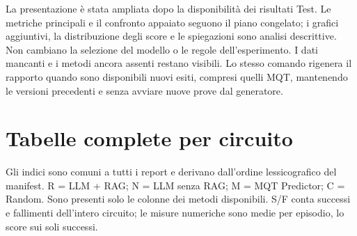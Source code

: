 La presentazione è stata ampliata dopo la disponibilità dei risultati Test.
Le metriche principali e il confronto appaiato seguono il piano congelato;
i grafici aggiuntivi, la distribuzione degli score e le spiegazioni sono analisi
descrittive. Non cambiano la selezione del modello o le regole dell'esperimento.
I dati mancanti e i metodi ancora assenti restano visibili. Lo stesso comando rigenera
il rapporto quando sono disponibili nuovi esiti, compresi quelli MQT, mantenendo
le versioni precedenti e senza avviare nuove prove dal generatore.
\clearpage\section{Tabelle complete per circuito}
Gli indici sono comuni a tutti i report e derivano dall’ordine lessicografico del manifest. R = LLM + RAG; N = LLM senza RAG; M = MQT Predictor; C = Random. Sono presenti solo le colonne dei metodi disponibili. S/F conta successi e fallimenti dell’intero circuito; le misure numeriche sono medie per episodio, lo score sui soli successi.
\begingroup\footnotesize
\setlength{\tabcolsep}{5pt}
